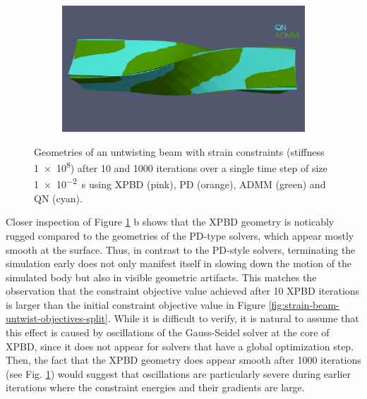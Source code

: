 \begin{figure}
\begin{subfigure}{0.49\textwidth}
    \end{subfigure}
    \hspace{0.001\textwidth}
    \begin{subfigure}{0.49\textwidth}
        \includegraphics[width=\textwidth, trim={0 4.5cm 0 2.15cm}, clip]{figures/strain_beam_untwist_QN_vs_ADMM_10_iterations.png}
    \end{subfigure}
    \caption{Geometries of an untwisting beam with strain constraints (stiffness \num{1e8}) after 10 and 1000 iterations over a single time step of size 
        \SI{1e-2}{\second} using XPBD (pink), PD (orange), ADMM (green) and QN (cyan).}
    \label{fig:strain-beam-untwist-geometries}
\end{figure}

Closer inspection of Figure \ref{fig:strain-beam-untwist-geometries} b shows that the XPBD geometry is noticably rugged compared to the geometries of the PD-type 
solvers, which 
appear mostly smooth at the surface. Thus, in contrast to the PD-style solvers, terminating the simulation early does not only manifest itself in slowing down 
the motion of the simulated body but also in visible geometric artifacts. This matches the observation that the constraint objective value achieved after 10 XPBD iterations 
is larger than the initial constraint objective value in Figure \ref{fig:strain-beam-untwist-objectives-split}. While it is difficult to verify, it is natural to assume that this 
effect is caused by oscillations of the Gauss-Seidel solver at the core of XPBD, since it does not appear for solvers that have a global optimization step. Then, the 
fact that the XPBD geometry does appear smooth after 1000 iterations (see Fig. \ref{fig:strain-beam-untwist-geometries}) would suggest that oscillations are particularly 
severe during earlier iterations where the constraint energies and their gradients are large.

